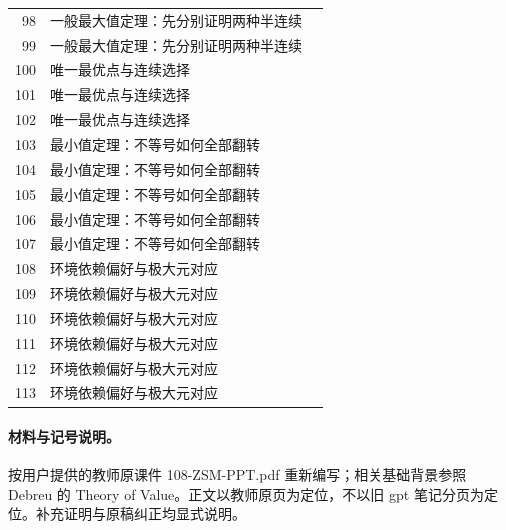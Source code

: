 \documentclass[11pt,a4paper]{article}
\theoremstyle{definition}\newtheorem{definition}{定义}\newtheorem{example}{例}
\begin{document}
\begin{longtable}{r p{.66\linewidth} r}
98 & 一般最大值定理：先分别证明两种半连续 & \pageref{g:108:96}\\

99 & 一般最大值定理：先分别证明两种半连续 & \pageref{g:108:96}\\

100 & 唯一最优点与连续选择 & \pageref{g:108:100}\\

101 & 唯一最优点与连续选择 & \pageref{g:108:100}\\

102 & 唯一最优点与连续选择 & \pageref{g:108:100}\\

103 & 最小值定理：不等号如何全部翻转 & \pageref{g:108:103}\\

104 & 最小值定理：不等号如何全部翻转 & \pageref{g:108:103}\\

105 & 最小值定理：不等号如何全部翻转 & \pageref{g:108:103}\\

106 & 最小值定理：不等号如何全部翻转 & \pageref{g:108:103}\\

107 & 最小值定理：不等号如何全部翻转 & \pageref{g:108:103}\\

108 & 环境依赖偏好与极大元对应 & \pageref{g:108:108}\\

109 & 环境依赖偏好与极大元对应 & \pageref{g:108:108}\\

110 & 环境依赖偏好与极大元对应 & \pageref{g:108:108}\\

111 & 环境依赖偏好与极大元对应 & \pageref{g:108:108}\\

112 & 环境依赖偏好与极大元对应 & \pageref{g:108:108}\\

113 & 环境依赖偏好与极大元对应 & \pageref{g:108:108}\\

\bottomrule\end{longtable}

\paragraph{材料与记号说明。}按用户提供的教师原课件 108-ZSM-PPT.pdf 重新编写；相关基础背景参照 Debreu 的 Theory of Value。正文以教师原页为定位，不以旧 gpt 笔记分页为定位。补充证明与原稿纠正均显式说明。
\clearpage
\end{document}
